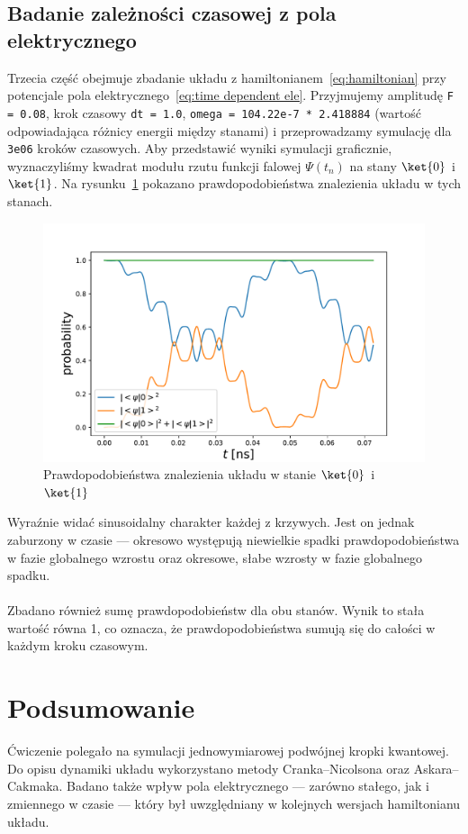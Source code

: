 \documentclass{article}
\begin{document}
\subsection{Badanie zależności czasowej z pola elektrycznego}
Trzecia część obejmuje zbadanie układu z hamiltonianem~\eqref{eq:hamiltonian} przy potencjale pola elektrycznego~\eqref{eq:time dependent ele}.
Przyjmujemy amplitudę \texttt{F = 0.08}, krok czasowy \texttt{dt = 1.0}, \texttt{omega = 104.22e-7 * 2.418884} (wartość odpowiadająca różnicy energii między stanami) i przeprowadzamy symulację dla \texttt{3e06} kroków czasowych.
Aby przedstawić wyniki symulacji graficznie, wyznaczyliśmy kwadrat modułu rzutu funkcji falowej $\Psi (t_n)$ na stany $\ket{0}$ i $\ket{1}$.
Na rysunku~\ref{fig:ex3} pokazano prawdopodobieństwa znalezienia układu w tych stanach.
\begin{figure}[htp!]
    \centering
    \includegraphics[width=0.8\linewidth]{ex3.pdf}
    \caption{Prawdopodobieństwa znalezienia układu w stanie $\ket{0}$ i $\ket{1}$}
    \label{fig:ex3}
\end{figure}
Wyraźnie widać sinusoidalny charakter każdej z krzywych.
Jest on jednak zaburzony w czasie — okresowo występują niewielkie spadki prawdopodobieństwa w fazie globalnego wzrostu oraz okresowe, słabe wzrosty w fazie globalnego spadku.\\
\\
Zbadano również sumę prawdopodobieństw dla obu stanów.
Wynik to stała wartość równa 1, co oznacza, że prawdopodobieństwa sumują się do całości w każdym kroku czasowym.


\section{Podsumowanie}
Ćwiczenie polegało na symulacji jednowymiarowej podwójnej kropki kwantowej.
Do opisu dynamiki układu wykorzystano metody Cranka–Nicolsona oraz Askara–Cakmaka.
Badano także wpływ pola elektrycznego — zarówno stałego, jak i zmiennego w czasie — który był uwzględniany w kolejnych wersjach hamiltonianu układu.


\end{document}
